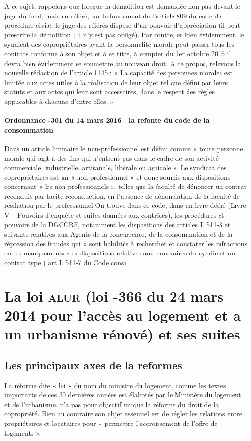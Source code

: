 			A ce sujet, rappelons que lorsque la démolition est demandée non pas devant le juge du fond, mais en référé, sur le fondement de l’article 809 du code de procédure civile, le juge des référés dispose d’un pouvoir d’appréciation (il peut prescrire la démolition ; il n’y est pas obligé).
			Par contre, et bien évidemment, le syndicat des copropriétaires ayant la personnalité morale peut passer tous les contrats conforme à son objet et à ce titre, à compter du 1er octobre 2016 il devra bien évidemment se soumettre au nouveau droit. A ce propos, relevons la nouvelle rédaction de l’article 1145 : « La capacité des personnes morales est limitée aux actes utiles à la réalisation de leur objet tel que défini par leurs statuts et aux actes qui leur sont accessoires, dans le respect des règles applicables à chacune d'entre elles. »
			
			\paragraph{Ordonnance -301 du 14 mars 2016 : la refonte du code de la consommation}

			Dans un article liminaire le non-professionnel est défini comme « toute personne morale qui agit à des fins qui n’entrent pas dans le cadre de son activité commerciale, industrielle, artisanale, libérale ou agricole ».
			Le syndicat des copropriétaires est un « non professionnel » et donc soumis aux dispositions concernant « les non professionnels », telles que la faculté de dénoncer un contrat reconduit par tacite reconduction, en l’absence de dénonciation de la faculté de résiliation par le professionnel
			On trouve dans ce code, dans un livre dédié (Livre V – Pouvoirs d’enquête et suites données aux contrôles), les procédures et pouvoirs de la DGCCRF, notamment les dispositions des articles L 511-3 et suivants relatives aux Agents de la concurrence, de la consommation et de la répression des fraudes qui « sont habilités à rechercher et constater les infractions ou les manquements aux dispositions relatives aux honoraires du syndic et au contrat type ( art L 511-7 du Code cons)
		
	\section[La loi \textsc{alur} et ses suites]{La loi \textsc{alur} (loi -366 du 24 mars 2014 pour l’accès au logement et a un urbanisme rénové) et ses suites}
	
		\subsection{Les principaux axes de la reformes}
			La réforme dite « loi  » du nom du ministre du logement, comme les textes importants de ces 30 dernières années est élaborés par le Ministère du logement et de l'urbanisme, n'a pas pour objectif unique la réforme du droit de la copropriété. Bien au contraire son objet essentiel est de régler les relations entre propriétaires et locataires pour « permettre l'accroissement de l'offre de logements ».
			
